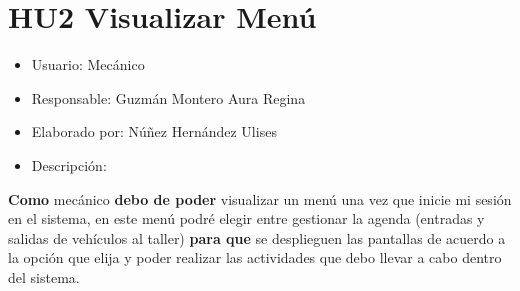 \section{HU2 Visualizar Menú}
\begin{itemize}
	\item Usuario: Mecánico
	\item Responsable: Guzmán Montero Aura Regina
	\item Elaborado por: Núñez Hernández Ulises
	\item Descripción:\\
\end{itemize}

\textbf{Como} mecánico \textbf{debo de poder} visualizar un menú una vez que inicie mi sesión en el sistema, en este menú podré elegir entre gestionar la agenda (entradas y salidas de vehículos al taller) \textbf{para que} se desplieguen las pantallas de acuerdo a la opción que elija y poder realizar las actividades que debo llevar a cabo dentro del sistema.